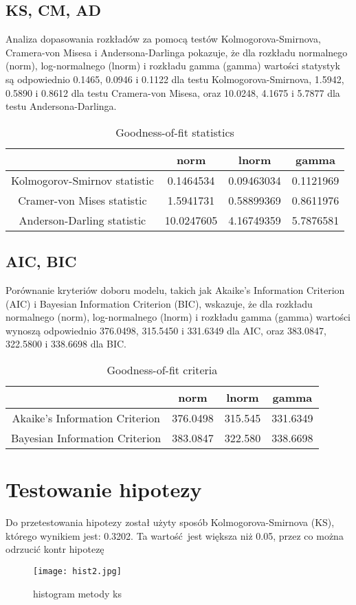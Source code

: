 \documentclass{article}
\begin{document}
	\subsection{KS, CM, AD}
		Analiza dopasowania rozkładów za pomocą
		testów Kolmogorova-Smirnova, Cramera-von Misesa i
		Andersona-Darlinga pokazuje, że dla rozkładu normalnego
		(norm), log-normalnego (lnorm) i rozkładu gamma (gamma)
		wartości statystyk są odpowiednio 0.1465, 0.0946 i
		0.1122 dla testu Kolmogorova-Smirnova, 1.5942, 0.5890
		i 0.8612 dla testu Cramera-von Misesa, oraz 10.0248,
		4.1675 i 5.7877 dla testu Andersona-Darlinga.
		\begin{table}[h]
			\renewcommand\tablename{Tabela}
			\centering
			\begin{tabular}{|c|c|c|c|}
				\hline
				& norm & lnorm & gamma \\
				\hline
				Kolmogorov-Smirnov statistic & 0.1464534 & 0.09463034 & 0.1121969 \\
				\hline
				Cramer-von Mises statistic & 1.5941731 & 0.58899369 & 0.8611976 \\
				\hline
				Anderson-Darling statistic & 10.0247605 & 4.16749359 & 5.7876581 \\
				\hline
			\end{tabular}
			\caption{Goodness-of-fit statistics}
		\end{table}
	\subsection{AIC, BIC}
		Porównanie kryteriów doboru modelu, takich jak Akaike's
		Information Criterion (AIC) i Bayesian Information
		Criterion (BIC), wskazuje, że dla rozkładu normalnego
		(norm), log-normalnego (lnorm) i rozkładu gamma (gamma)
		wartości wynoszą odpowiednio 376.0498, 315.5450 i
		331.6349 dla AIC, oraz 383.0847, 322.5800 i 338.6698
		dla BIC.
		\begin{table}[h]
			\renewcommand\tablename{Tabela}
			\centering
			\begin{tabular}{|c|c|c|c|}
				\hline
				& norm & lnorm & gamma \\
				\hline
				Akaike's Information Criterion & 376.0498 & 315.545 & 331.6349 \\
				\hline
				Bayesian Information Criterion & 383.0847 & 322.580 & 338.6698 \\
				\hline
			\end{tabular}
			\caption{Goodness-of-fit criteria}
		\end{table}
\newpage
\section{Testowanie hipotezy}
	Do przetestowania hipotezy został użyty sposób Kolmogorova-Smirnova
	(KS), którego wynikiem jest: 0.3202. Ta wartość jest większa
	niż 0.05, przez co można odrzucić kontr hipotezę
	\begin{figure}[H]
		\centering
		\renewcommand\figurename{Wykres}
		\texttt{[image: hist2.jpg]}
		\caption{histogram metody ks}
	\end{figure}
\end{document}

